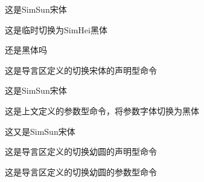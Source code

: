 \documentclass{article}
\newcommand{\youyuan}[1]{{\youyuandecl#1}} %
\begin{document}
这是SimSun宋体

这是临时切换为SimHei黑体

还是黑体吗
\newcommand{\heiti}[1]{{#1}}

\SwitchToSong
这是导言区定义的切换宋体的声明型命令

这是SimSun宋体

\heiti{这是上文定义的参数型命令，将参数字体切换为黑体}

这又是SimSun宋体

{\youyuandecl 这是导言区定义的切换幼圆的声明型命令}

\youyuan{这是导言区定义的切换幼圆的参数型命令}


\end{document}
